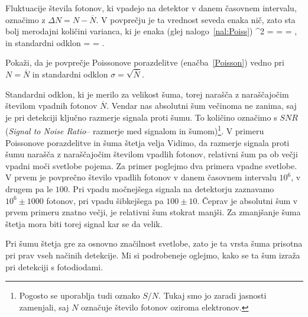 Fluktuacije števila fotonov, ki vpadejo na detektor v danem časovnem 
intervalu, označimo z $\Delta N = N-\overline{N}$. V povprečju je ta vrednost seveda enaka nič, 
zato sta bolj merodajni količini varianca, ki je enaka (glej nalogo~\ref{nal:Poiss})
\beq
\sigma^2 = =  = ,
\label{varianca}
\eeq
in standardni odklon
\beq
\sigma =  = .
\label{sigma}
\eeq
\begin{definition}
Pokaži, da je povprečje Poissonove porazdelitve (enačba~\ref{Poisson}) vedno pri $N = \overline{N}$
in standardni odklon $\sigma = \sqrt{\overline{N}}$.
\label{nal:Poiss}
\end{definition}

Standardni odklon, ki je merilo za velikost šuma, torej narašča z naraščajočim številom 
vpadnih fotonov $\overline{N}$. Vendar nas absolutni šum večinoma ne zanima, 
saj je pri detekciji ključno razmerje 
signala proti šumu. To količino označimo s $SNR$ ({\it Signal to Noise Ratio}-- razmerje med 
signalom in šumom)\footnote{Pogosto se uporablja tudi oznako $S/N$. Tukaj smo jo 
zaradi jasnosti zamenjali, saj $N$ označuje število fotonov oziroma elektronov.}. 
V primeru Poissonove porazdelitve in šuma štetja velja
Vidimo, da razmerje signala proti šumu narašča z naraščajočim številom vpadlih fotonov, 
relativni šum pa ob večji vpadni moči svetlobe pojema. Za primer poglejmo dva primera vpadne svetlobe. 
V prvem je povprečno število vpadlih fotonov v danem časovnem 
intervalu $10^6$, v drugem pa le $100$. Pri vpadu močnejšega signala 
na detektorju zaznavamo $10^6 \pm 1000$ fotonov, pri vpadu šibkejšega
pa $100 \pm 10$. Čeprav je absolutni šum v prvem primeru znatno večji, 
je relativni šum stokrat manjši. Za zmanjšanje šuma štetja mora biti 
torej signal kar se da velik. 

Pri šumu štetja gre za osnovno značilnost svetlobe, zato je ta vrsta šuma
prisotna pri prav vseh načinih detekcije. Mi si podrobeneje oglejmo, 
kako se ta šum izraža pri detekciji s fotodiodami. 

